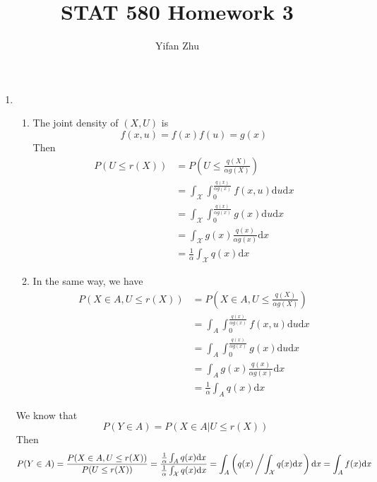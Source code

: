 \documentclass{article}
\begin{document}
	

	
	\title{STAT 580 Homework 3}
	\author{Yifan Zhu}
	\maketitle
	
	\begin{enumerate}[leftmargin = 0 em, label = \arabic*., font = \bfseries]
	\item 
	\begin{enumerate}
		\item 
		The joint density of $(X,U)$ is 
		\[f(x,u) = f(x)f(u) = g(x)\]
		Then
		\begin{align*}
		P(U\leq r(X)) & = P\left(U\leq \frac{q(X)}{\alpha g(X)}\right)\\
		& = \int_{\mathcal{X}} \int_{0}^{\frac{q(x)}{\alpha g(x)}} f(x,u) \mathrm{d}u \mathrm{d}x\\
		& = \int_{\mathcal{X}} \int_{0}^{\frac{q(x)}{\alpha g(x)}} g(x) \mathrm{d}u \mathrm{d}x\\
		& = \int_{\mathcal{X}} g(x) \frac{q(x)}{\alpha g(x)} \mathrm{d}x\\
		& = \frac{1}{\alpha} \int_{\mathcal{X}} q(x) \mathrm{d}x
		\end{align*}


		\item 
		In the same way, we have 
		\begin{align*}
		P(X \in A, U\leq r(X)) & = P\left(X\in A, U\leq \frac{q(X)}{\alpha g(X)}\right)\\
		& = \int_{A} \int_{0}^{\frac{q(x)}{\alpha g(x)}} f(x,u) \mathrm{d}u \mathrm{d}x\\
		& = \int_{A} \int_{0}^{\frac{q(x)}{\alpha g(x)}} g(x) \mathrm{d}u \mathrm{d}x\\
		& = \int_{A} g(x) \frac{q(x)}{\alpha g(x)} \mathrm{d}x\\
		& = \frac{1}{\alpha} \int_{A} q(x) \mathrm{d}x
		\end{align*}

	\end{enumerate}

	We know that 
	\[P(Y \in A) = P(X\in A|U\leq r(X))\]
	Then
	\[P(Y\in A) = \frac{P(X \in A, U \leq r(X))}{P(U \leq r(X))} = \frac{\frac{1}{\alpha}\int_{A}  q(x) \mathrm{d}x}{\frac{1}{\alpha} \int_{\mathcal{X}} q(x) \mathrm{d}x} = \int_{A} \left(q(x)\left/\int_{\mathcal{X}} q(x) \mathrm{d}x\right.\right)\mathrm{d}x = \int_{A} f(x) \mathrm{d}x\]




\end{enumerate}
\end{document}
